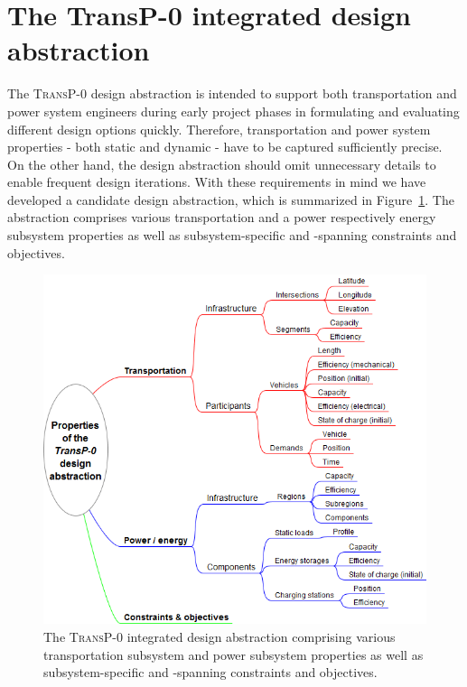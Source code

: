 \section{The \textbf{TransP-0} integrated design abstraction}
\label{proposed_model}

The \textsc{TransP-0} design abstraction is intended to support both transportation and power system engineers during early project phases in formulating and evaluating different design options quickly. Therefore, transportation and power system properties - both static and dynamic - have to be captured sufficiently precise. On the other hand, the design abstraction should omit unnecessary details to enable frequent design iterations. With these requirements in mind we have developed a candidate design abstraction, which is summarized in Figure~\ref{system_design}. The abstraction comprises various transportation and a power respectively energy subsystem properties as well as subsystem-specific and -spanning constraints and objectives.

\begin{figure}[h!]
	\includegraphics[width=\columnwidth]{./gfx/system_design.png}
	\caption{The \textsc{TransP-0} integrated design abstraction comprising various transportation subsystem and power subsystem properties as well as subsystem-specific and -spanning constraints and objectives.}
	\label{system_design}
\end{figure}

